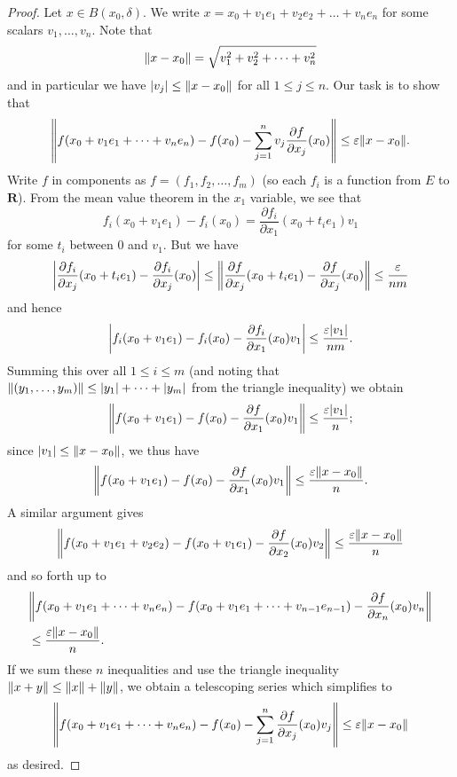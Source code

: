 \begin{proof}
    Let \(x \in B(x_0, \delta)\).
    We write \(x = x_0 + v_1 e_1 + v_2 e_2 + \dots + v_n e_n\) for some scalars \(v_1, \dots, v_n\).
    Note that
    \[
        \norm*{x - x_0} = \sqrt{v_1^2 + v_2^2 + \dots + v_n^2}
    \]
    and in particular we have \(\abs*{v_j} \leq \norm*{x - x_0}\) for all \(1 \leq j \leq n\).
    Our task is to show that
    \[
        \norm*{f(x_0 + v_1 e_1 + \dots + v_n e_n) - f(x_0) - \sum_{j = 1}^n v_j \frac{\partial f}{\partial x_j}(x_0)} \leq \varepsilon \norm*{x - x_0}.
    \]
    Write \(f\) in components as \(f = (f_1 , f_2, \dots, f_m)\)
    (so each \(f_i\) is a function from \(E\) to \(\mathbf{R}\)).
    From the mean value theorem in the \(x_1\) variable, we see that
    \[
        f_i(x_0 + v_1 e_1) - f_i(x_0) = \frac{\partial f_i}{\partial x_1}(x_0 + t_i e_1) v_1
    \]
    for some \(t_i\) between \(0\) and \(v_1\).
    But we have
    \[
        \abs*{\frac{\partial f_i}{\partial x_j}(x_0 + t_i e_1) - \frac{\partial f_i}{\partial x_j}(x_0)} \leq \norm*{\frac{\partial f}{\partial x_j}(x_0 + t_i e_1) - \frac{\partial f}{\partial x_j}(x_0)} \leq \frac{\varepsilon}{nm}
    \]
    and hence
    \[
        \abs*{f_i(x_0 + v_1 e_1) - f_i(x_0) - \frac{\partial f_i}{\partial x_1}(x_0) v_1} \leq \frac{\varepsilon \abs*{v_1}}{nm}.
    \]
    Summing this over all \(1 \leq i \leq m\) (and noting that \(\norm*{(y_1, \dots, y_m)} \leq \abs*{y_1} + \dots + \abs*{y_m}\) from the triangle inequality) we obtain
    \[
        \norm*{f(x_0 + v_1 e_1) - f(x_0) - \frac{\partial f}{\partial x_1}(x_0) v_1} \leq \frac{\varepsilon \abs*{v_1}}{n};
    \]
    since \(\abs*{v_1} \leq \norm*{x - x_0}\), we thus have
    \[
        \norm*{f(x_0 + v_1 e_1) - f(x_0) - \frac{\partial f}{\partial x_1}(x_0) v_1} \leq \frac{\varepsilon \norm*{x - x_0}}{n}.
    \]
    A similar argument gives
    \[
        \norm*{f(x_0 + v_1 e_1 + v_2 e_2) - f(x_0 + v_1 e_1) - \frac{\partial f}{\partial x_2}(x_0) v_2} \leq \frac{\varepsilon \norm*{x - x_0}}{n}
    \]
    and so forth up to
    \begin{align*}
         & \norm*{f(x_0 + v_1 e_1 + \dots + v_n e_n) - f(x_0 + v_1 e_1 + \dots + v_{n - 1} e_{n - 1}) - \frac{\partial f}{\partial x_n}(x_0) v_n} \\
         & \leq \frac{\varepsilon \norm*{x - x_0}}{n}.
    \end{align*}
    If we sum these \(n\) inequalities and use the triangle inequality \(\norm*{x + y} \leq \norm*{x} + \norm*{y}\), we obtain a telescoping series which simplifies to
    \[
        \norm*{f(x_0 + v_1 e_1 + \dots + v_n e_n) - f(x_0) - \sum_{j = 1}^n \frac{\partial f}{\partial x_j}(x_0) v_j} \leq \varepsilon \norm*{x - x_0}
    \]
    as desired.
\end{proof}

